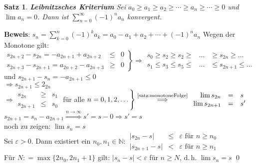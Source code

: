 \documentclass[ngerman,titlepage,twoside, parskip=half*]{scrreprt}
\newcommand*{\N}{\mathbb{N}}
\theoremstyle{plain}
\newtheorem{theorem}{Satz}[section]
\theoremstyle{definition}
\theoremstyle{remark}
\newcommand*{\abs}[2][]{#1\lvert#2#1\rvert}
\newcommand*{\coloneqq}{\mathrel{\mathop:}=}
\begin{document}
\begin{theorem}
\label{satz:LeibKrit}
\textbf{Leibnitzsches Kriterium} Sei $a_0\geq a_1\geq a_2\geq \cdots \geq a_n\geq \cdots
\geq 0$ und $\lim a_n=0$. Dann ist $\sum_{n=0}^\infty (-1)^na_n$ konvergent.
\end{theorem}
\textbf{Beweis}: $s_n=\sum_{k=0}^n (-1)^ka_k=a_0-a_1+a_2+\cdots +(-1)^na_n$ Wegen der Monotone gilt:\\
$\left.
\begin{array}{rcl}
  s_{2n+2}-s_{2n}=-a_{2n+1}+a_{2n+2} & \leq & 0\\
  s_{2n+3}-s_{2n+1}=a_{2n+2}-a_{2n+3} & \geq & 0
\end{array}
\right\} \Rightarrow
\begin{array}{rcl}
  s_0\geq s_2\geq s_2\geq & \ldots & \geq s_{2n}\geq \ldots\\
  s_1\leq s_3\leq s_5\leq & \ldots & \leq s_{2n+1}\leq \ldots
\end{array}$ und $s_{2n+1}-s_n=-a_{2n+1}\leq 0$\\
$\Rightarrow s_{2n+1}\leq 2_{2n}$\\
$\Rightarrow
\begin{array}{rcl}
  s_{2n} &\geq & s_1\\
  s_{2n+1}&\leq & s_0
\end{array}$
für alle $n=0,1,2,\ldots \Bigg\}\stackrel{\text{\autoref{satz:monotoneFolge}}}{\Longrightarrow}
\begin{array}{rcl}
  \lim s_{2n} & = & s\\
  \lim s_{2n+1} & = & s'
\end{array}$\\
$s_{2n+1}=s_n-a_{2n+1}\stackrel{n\rightarrow\infty}{\Longrightarrow} s'=s-0\Rightarrow s'=s$\\
noch zu zeigen: $\lim s_n=s$\\
Sei $\varepsilon>0$. Dann existiert ein $n_0, n_1 \in \N \colon
\begin{array}{rcl}
  \abs{s_{2n}-s} & \leq & \varepsilon \text{ für } n\geq n_0\\
  \abs{s_{2n+1}-s} &< & \varepsilon \text{ für } n\geq n_1
\end{array}$\\
Für $N\coloneqq\max\{2n_0,2n_1+1\}$ gilt: $\abs{s_n-s}<\varepsilon$ für $n\geq N$, d.\,h. $\lim s_n=s$
\qed
\end{document}
